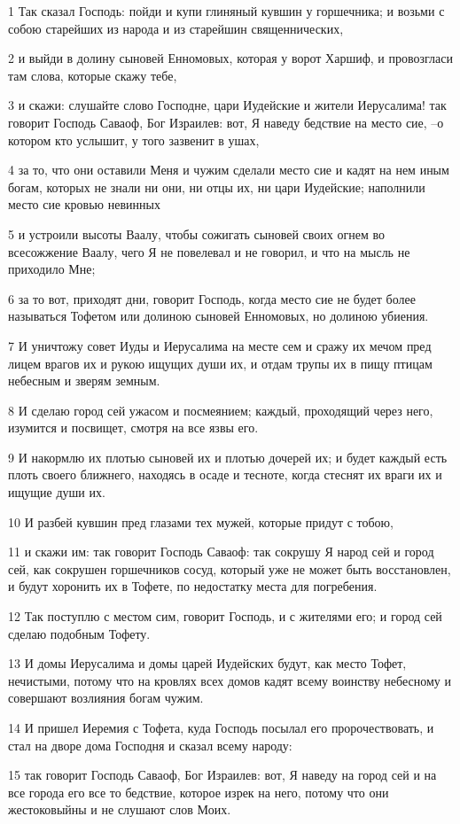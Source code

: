 \par 1 Так сказал Господь: пойди и купи глиняный кувшин у горшечника; и возьми с собою старейших из народа и из старейшин священнических,
\par 2 и выйди в долину сыновей Енномовых, которая у ворот Харшиф, и провозгласи там слова, которые скажу тебе,
\par 3 и скажи: слушайте слово Господне, цари Иудейские и жители Иерусалима! так говорит Господь Саваоф, Бог Израилев: вот, Я наведу бедствие на место сие, --о котором кто услышит, у того зазвенит в ушах,
\par 4 за то, что они оставили Меня и чужим сделали место сие и кадят на нем иным богам, которых не знали ни они, ни отцы их, ни цари Иудейские; наполнили место сие кровью невинных
\par 5 и устроили высоты Ваалу, чтобы сожигать сыновей своих огнем во всесожжение Ваалу, чего Я не повелевал и не говорил, и что на мысль не приходило Мне;
\par 6 за то вот, приходят дни, говорит Господь, когда место сие не будет более называться Тофетом или долиною сыновей Енномовых, но долиною убиения.
\par 7 И уничтожу совет Иуды и Иерусалима на месте сем и сражу их мечом пред лицем врагов их и рукою ищущих души их, и отдам трупы их в пищу птицам небесным и зверям земным.
\par 8 И сделаю город сей ужасом и посмеянием; каждый, проходящий через него, изумится и посвищет, смотря на все язвы его.
\par 9 И накормлю их плотью сыновей их и плотью дочерей их; и будет каждый есть плоть своего ближнего, находясь в осаде и тесноте, когда стеснят их враги их и ищущие души их.
\par 10 И разбей кувшин пред глазами тех мужей, которые придут с тобою,
\par 11 и скажи им: так говорит Господь Саваоф: так сокрушу Я народ сей и город сей, как сокрушен горшечников сосуд, который уже не может быть восстановлен, и будут хоронить их в Тофете, по недостатку места для погребения.
\par 12 Так поступлю с местом сим, говорит Господь, и с жителями его; и город сей сделаю подобным Тофету.
\par 13 И домы Иерусалима и домы царей Иудейских будут, как место Тофет, нечистыми, потому что на кровлях всех домов кадят всему воинству небесному и совершают возлияния богам чужим.
\par 14 И пришел Иеремия с Тофета, куда Господь посылал его пророчествовать, и стал на дворе дома Господня и сказал всему народу:
\par 15 так говорит Господь Саваоф, Бог Израилев: вот, Я наведу на город сей и на все города его все то бедствие, которое изрек на него, потому что они жестоковыйны и не слушают слов Моих.

